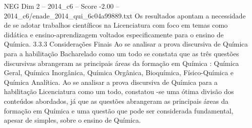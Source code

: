 \begin{textsample}{NEG Dim 2 – 2014\_c6 – Score -2.00 – 2014\_c6/enade\_2014\_qui\_6c04a99889.txt}
Os resultados apontam a necessidade de se adotar trabalhos científicos na Licenciatura com foco em temas como didática e ensino-aprendizagem voltados especificamente para o ensino de Química. 3.3.3 Considerações Finais Ao se analisar a prova discursiva de Química para a habilitação Bacharelado como um todo se constata que as três questões discursivas abrangeram as principais áreas da formação em Química : Química Geral, Química Inorgânica, Química Orgânica, Bioquímica, Físico-Química e Química Analítica.
Ao se analisar a prova discursiva de Química para a habilitação Licenciatura como um todo, constatou -se uma ótima divisão dos conteúdos abordados, já que as questões abrangeram as principais áreas da formação em Química e uma questão que pode ser considerada fundamental, apesar de simples, sobre o ensino de Química.

\end{textsample}
